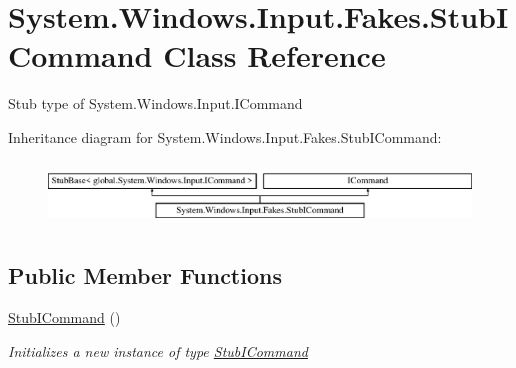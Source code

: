 \hypertarget{class_system_1_1_windows_1_1_input_1_1_fakes_1_1_stub_i_command}{\section{System.\-Windows.\-Input.\-Fakes.\-Stub\-I\-Command Class Reference}
\label{class_system_1_1_windows_1_1_input_1_1_fakes_1_1_stub_i_command}
}


Stub type of System.\-Windows.\-Input.\-I\-Command 


Inheritance diagram for System.\-Windows.\-Input.\-Fakes.\-Stub\-I\-Command\-:\begin{figure}[H]
\begin{center}
\leavevmode
\includegraphics[height=1.739130cm]{class_system_1_1_windows_1_1_input_1_1_fakes_1_1_stub_i_command}
\end{center}
\end{figure}
\subsection*{Public Member Functions}
\begin{DoxyCompactItemize}
\item 
\hyperlink{class_system_1_1_windows_1_1_input_1_1_fakes_1_1_stub_i_command_a2eea56714d0b9cd3c2fb7637c2ec1ee5}{Stub\-I\-Command} ()
\begin{DoxyCompactList}\small\item\em Initializes a new instance of type \hyperlink{class_system_1_1_windows_1_1_input_1_1_fakes_1_1_stub_i_command}{Stub\-I\-Command}\end{DoxyCompactList}\end{DoxyCompactItemize}
